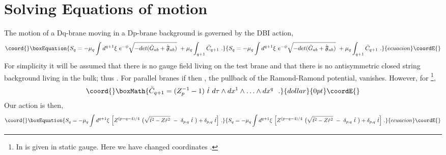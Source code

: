 \documentclass[a4paper,12pt]{article}
\providecommand{\gtab}{\Tilde{G}_{a b}}
\providecommand{\ft}{\Tilde{\mathfrak F}}
\providecommand{\rds}{\dot{r}^2}
\providecommand{\td}{\dot{t}}
\providecommand{\tds}{\dot{t}^2}
\begin{document}
\section{Solving Equations of motion}
%
%
%
The motion of a Dq-brane moving in a Dp-brane background is governed by
the DBI action\cite{jbbs},
\begin{equation}\coord{}\boxEquation{
S_q = -\mu_q \int d^{q+1}\xi \ e^{- \phi} \sqrt{-det(\gtab + \ft_{a b})}
\ + \mu_q \int_{q+1} \Tilde{C}_{q+1} \ .
\label{DBI}
}{
S_q = -\mu_q \int d^{q+1}\xi \ e^{- \phi} \sqrt{-det(\gtab + \ft_{a b})}
\ + \mu_q \int_{q+1} \Tilde{C}_{q+1} \ .
}{ecuacion}\coordE{}\end{equation}
For simplicity it will be assumed that there is no gauge field living
on the test brane and that there is no antisymmetric closed string
background living in the bulk; thus \myHighlight{$\ft_{a b} = 0$}\coordHE{}.  
For parallel branes if \coordHE{} then \coordHE{}, the pullback
of the Ramond-Ramond potential, vanishes.  However, for 
\coordHE{} \cite{johnsn}\footnote{In \cite{johnsn} \coordHE{} is
given in static gauge.  Here we have changed coordinates 
\coordHE{}.},
$$\coord{}\boxMath{ 
\Tilde{C}_{q+1} = (Z_p^{-1} - 1) \ \td \
d\tau \wedge dx^1 \wedge \ldots \wedge dx^q \ \ .
}{dollar}{0pt}\coordE{}$$
Our action is then,
\begin{equation}\coord{}\boxEquation{
S_q = -\mu_q \int d^{q+1}\xi \ \Bigl[Z^{(p-q-4)/4} 
\ \bigl(\sqrt{\tds - Z \rds} \ - \ \delta_{p,q} \ \td \ \bigr) 
+ \delta_{p,q} \ \td \Bigr] \ .
\label{action}
}{
S_q = -\mu_q \int d^{q+1}\xi \ \Bigl[Z^{(p-q-4)/4} 
\ \bigl(\sqrt{\tds - Z \rds} \ - \ \delta_{p,q} \ \td \ \bigr) 
+ \delta_{p,q} \ \td \Bigr] \ .
}{ecuacion}\coordE{}\end{equation}
\end{document}
